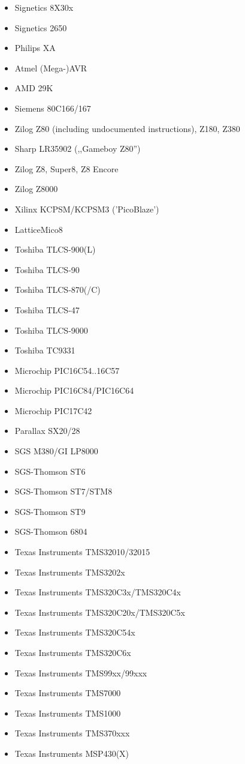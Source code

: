 \documentclass[12pt,twoside]{report}
\begin{document}
\begin{itemize}
\item{Signetics 8X30x}
\item{Signetics 2650}
\item{Philips XA}
\item{Atmel (Mega-)AVR}
\item{AMD 29K}
\item{Siemens 80C166/167}
\item{Zilog Z80 (including undocumented instructions), Z180, Z380}
\item{Sharp LR35902 (,,Gameboy Z80'')}
\item{Zilog Z8, Super8, Z8 Encore}
\item{Zilog Z8000}
\item{Xilinx KCPSM/KCPSM3 ('PicoBlaze')}
\item{LatticeMico8}
\item{Toshiba TLCS-900(L)}
\item{Toshiba TLCS-90}
\item{Toshiba TLCS-870(/C)}
\item{Toshiba TLCS-47}
\item{Toshiba TLCS-9000}
\item{Toshiba TC9331}
\item{Microchip PIC16C54..16C57}
\item{Microchip PIC16C84/PIC16C64}
\item{Microchip PIC17C42}
\item{Parallax SX20/28}
\item{SGS M380/GI LP8000}
\item{SGS-Thomson ST6}
\item{SGS-Thomson ST7/STM8}
\item{SGS-Thomson ST9}
\item{SGS-Thomson 6804}
\item{Texas Instruments TMS32010/32015}
\item{Texas Instruments TMS3202x}
\item{Texas Instruments TMS320C3x/TMS320C4x}
\item{Texas Instruments TMS320C20x/TMS320C5x}
\item{Texas Instruments TMS320C54x}
\item{Texas Instruments TMS320C6x}
\item{Texas Instruments TMS99xx/99xxx}
\item{Texas Instruments TMS7000}
\item{Texas Instruments TMS1000}
\item{Texas Instruments TMS370xxx}
\item{Texas Instruments MSP430(X)}

\end{itemize}
\end{document}
